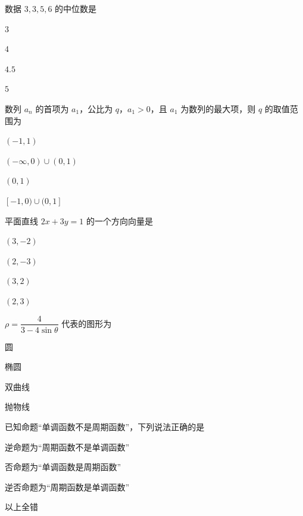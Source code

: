 \documentclass{exam-zh}
\begin{document}
\begin{question}
数据 $3,3,5,6$ 的中位数是 \paren[]
\begin{choices}
  \item $3$
  \item $4$
  \item $4.5$
  \item $5$
\end{choices}
\end{question}

\begin{question}
数列 $a_n$ 的首项为 $a_1$，公比为 $q$，$a_1>0$，且 $a_1$ 为数列的最大项，则 $q$ 的取值范围为 \paren[]
\begin{choices}
  \item $(-1,1)$
  \item $(-\infty,0)\cup(0,1)$
  \item $(0,1)$
  \item $[-1,0)\cup(0,1]$
\end{choices}
\end{question}

\begin{question}
平面直线 $2x+3y=1$ 的一个方向向量是 \paren[]
\begin{choices}
  \item $(3,-2)$
  \item $(2,-3)$
  \item $(3,2)$
  \item $(2,3)$
\end{choices}
\end{question}

\begin{question}
$\rho=\dfrac{4}{3-4\sin\theta}$ 代表的图形为 \paren[]
\begin{choices}
  \item 圆
  \item 椭圆
  \item 双曲线
  \item 抛物线
\end{choices}
\end{question}

\begin{question}
已知命题“单调函数不是周期函数”，下列说法正确的是 \paren[]
\begin{choices}
  \item 逆命题为“周期函数不是单调函数”
  \item 否命题为“单调函数是周期函数”
  \item 逆否命题为“周期函数是单调函数”
  \item 以上全错
\end{choices}
\end{question}
\end{document}
